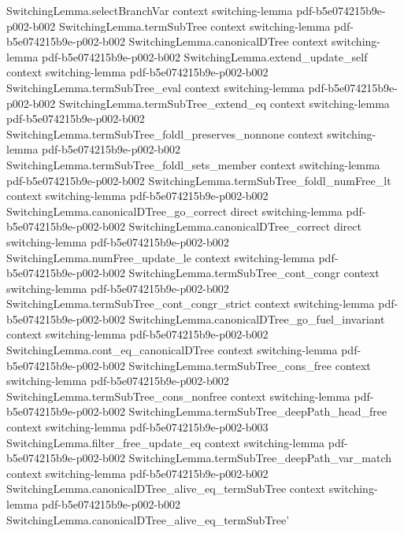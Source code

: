 \begin{theorem}
\proofstep
  {SwitchingLemma.selectBranchVar}
  {context}
  {switching-lemma}
  {pdf-b5e074215b9e-p002-b002}
\proofstep
  {SwitchingLemma.termSubTree}
  {context}
  {switching-lemma}
  {pdf-b5e074215b9e-p002-b002}
\proofstep
  {SwitchingLemma.canonicalDTree}
  {context}
  {switching-lemma}
  {pdf-b5e074215b9e-p002-b002}
\proofstep
  {SwitchingLemma.extend_update_self}
  {context}
  {switching-lemma}
  {pdf-b5e074215b9e-p002-b002}
\proofstep
  {SwitchingLemma.termSubTree_eval}
  {context}
  {switching-lemma}
  {pdf-b5e074215b9e-p002-b002}
\proofstep
  {SwitchingLemma.termSubTree_extend_eq}
  {context}
  {switching-lemma}
  {pdf-b5e074215b9e-p002-b002}
\proofstep
  {SwitchingLemma.termSubTree_foldl_preserves_nonnone}
  {context}
  {switching-lemma}
  {pdf-b5e074215b9e-p002-b002}
\proofstep
  {SwitchingLemma.termSubTree_foldl_sets_member}
  {context}
  {switching-lemma}
  {pdf-b5e074215b9e-p002-b002}
\proofstep
  {SwitchingLemma.termSubTree_foldl_numFree_lt}
  {context}
  {switching-lemma}
  {pdf-b5e074215b9e-p002-b002}
\proofstep
  {SwitchingLemma.canonicalDTree_go_correct}
  {direct}
  {switching-lemma}
  {pdf-b5e074215b9e-p002-b002}
\proofstep
  {SwitchingLemma.canonicalDTree_correct}
  {direct}
  {switching-lemma}
  {pdf-b5e074215b9e-p002-b002}
\proofstep
  {SwitchingLemma.numFree_update_le}
  {context}
  {switching-lemma}
  {pdf-b5e074215b9e-p002-b002}
\proofstep
  {SwitchingLemma.termSubTree_cont_congr}
  {context}
  {switching-lemma}
  {pdf-b5e074215b9e-p002-b002}
\proofstep
  {SwitchingLemma.termSubTree_cont_congr_strict}
  {context}
  {switching-lemma}
  {pdf-b5e074215b9e-p002-b002}
\proofstep
  {SwitchingLemma.canonicalDTree_go_fuel_invariant}
  {context}
  {switching-lemma}
  {pdf-b5e074215b9e-p002-b002}
\proofstep
  {SwitchingLemma.cont_eq_canonicalDTree}
  {context}
  {switching-lemma}
  {pdf-b5e074215b9e-p002-b002}
\proofstep
  {SwitchingLemma.termSubTree_cons_free}
  {context}
  {switching-lemma}
  {pdf-b5e074215b9e-p002-b002}
\proofstep
  {SwitchingLemma.termSubTree_cons_nonfree}
  {context}
  {switching-lemma}
  {pdf-b5e074215b9e-p002-b002}
\proofstep
  {SwitchingLemma.termSubTree_deepPath_head_free}
  {context}
  {switching-lemma}
  {pdf-b5e074215b9e-p002-b003}
\proofstep
  {SwitchingLemma.filter_free_update_eq}
  {context}
  {switching-lemma}
  {pdf-b5e074215b9e-p002-b002}
\proofstep
  {SwitchingLemma.termSubTree_deepPath_var_match}
  {context}
  {switching-lemma}
  {pdf-b5e074215b9e-p002-b002}
\proofstep
  {SwitchingLemma.canonicalDTree_alive_eq_termSubTree}
  {context}
  {switching-lemma}
  {pdf-b5e074215b9e-p002-b002}
\proofstep
  {SwitchingLemma.canonicalDTree_alive_eq_termSubTree'}

\end{theorem}
